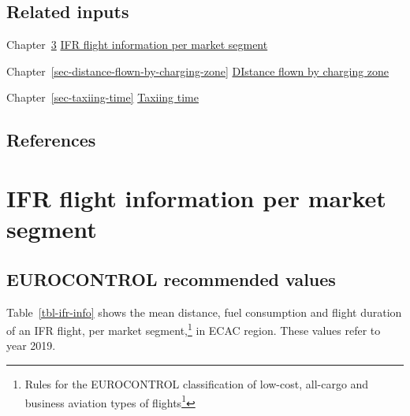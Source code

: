 \documentclass[
  11pt,
  a4paper,
]{book}
\DeclareRobustCommand{\href}[2]{#2\footnote{\url{#1}}}
\begin{document}
\hypertarget{related-inputs-14}{%
\section{Related inputs}\label{related-inputs-14}}

Chapter~\ref{sec-ifr-flight-information-per-market-segment}
\protect\hyperlink{sec-ifr-flight-information-per-market-segment}{IFR
flight information per market segment}

Chapter~\ref{sec-distance-flown-by-charging-zone}
\protect\hyperlink{sec-distance-flown-by-charging-zone}{DIstance flown
by charging zone}

Chapter~\ref{sec-taxiing-time}
\protect\hyperlink{sec-taxiing-time}{Taxiing time}

\hypertarget{references-18}{%
\section{References}\label{references-18}}

\hypertarget{sec-ifr-flight-information-per-market-segment}{%
\chapter{IFR flight information per market
segment}\label{sec-ifr-flight-information-per-market-segment}}

\hypertarget{eurocontrol-recommended-values-17}{%
\section{EUROCONTROL recommended
values}\label{eurocontrol-recommended-values-17}}

Table~\ref{tbl-ifr-info} shows the mean distance, fuel consumption and
flight duration of an IFR flight, per market segment,\footnote{\href{https://www.eurocontrol.int/publication/market-segment-rules}{Rules
  for the EUROCONTROL classification of low-cost, all-cargo and business
  aviation types of flights}} in ECAC region. These values refer to year
2019.
\end{document}
